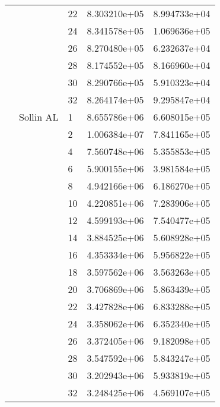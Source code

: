 \begin{tabular}{lllrr}
                      &            & 22 &  8.303210e+05 &  8.994733e+04 \\
                      &            & 24 &  8.341578e+05 &  1.069636e+05 \\
                      &            & 26 &  8.270480e+05 &  6.232637e+04 \\
                      &            & 28 &  8.174552e+05 &  8.166960e+04 \\
                      &            & 30 &  8.290766e+05 &  5.910323e+04 \\
                      &            & 32 &  8.264174e+05 &  9.295847e+04 \\
                      & Sollin AL & 1  &  8.655786e+06 &  6.608015e+05 \\
                      &            & 2  &  1.006384e+07 &  7.841165e+05 \\
                      &            & 4  &  7.560748e+06 &  5.355853e+05 \\
                      &            & 6  &  5.900155e+06 &  3.981584e+05 \\
                      &            & 8  &  4.942166e+06 &  6.186270e+05 \\
                      &            & 10 &  4.220851e+06 &  7.283906e+05 \\
                      &            & 12 &  4.599193e+06 &  7.540477e+05 \\
                      &            & 14 &  3.884525e+06 &  5.608928e+05 \\
                      &            & 16 &  4.353334e+06 &  5.956822e+05 \\
                      &            & 18 &  3.597562e+06 &  3.563263e+05 \\
                      &            & 20 &  3.706869e+06 &  5.863439e+05 \\
                      &            & 22 &  3.427828e+06 &  6.833288e+05 \\
                      &            & 24 &  3.358062e+06 &  6.352340e+05 \\
                      &            & 26 &  3.372405e+06 &  9.182098e+05 \\
                      &            & 28 &  3.547592e+06 &  5.843247e+05 \\
                      &            & 30 &  3.202943e+06 &  5.933819e+05 \\
                      &            & 32 &  3.248425e+06 &  4.569107e+05 \\

\end{tabular}
